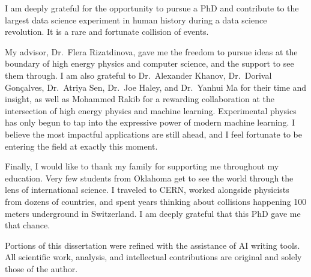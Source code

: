 I am deeply grateful for the opportunity to pursue a PhD and contribute to the largest data science experiment in human history during a data science revolution. It is a rare and fortunate collision of events.

My advisor, Dr.~Flera Rizatdinova, gave me the freedom to pursue ideas at the boundary of high energy physics and computer science, and the support to see them through. I am also grateful to Dr.~Alexander Khanov, Dr.~Dorival Gonçalves, Dr.~Atriya Sen, Dr.~Joe Haley, and Dr.~Yanhui Ma for their time and insight, as well as Mohammed Rakib for a rewarding collaboration at the intersection of high energy physics and machine learning. Experimental physics has only begun to tap into the expressive power of modern machine learning. I believe the most impactful applications are still ahead, and I feel fortunate to be entering the field at exactly this moment.

Finally, I would like to thank my family for supporting me throughout my education. Very few students from Oklahoma get to see the world through the lens of international science. I traveled to CERN, worked alongside physicists from dozens of countries, and spent years thinking about collisions happening 100 meters underground in Switzerland. I am deeply grateful that this PhD gave me that chance.

Portions of this dissertation were refined with the assistance of AI writing tools. All scientific work, analysis, and intellectual contributions are original and solely those of the author.



